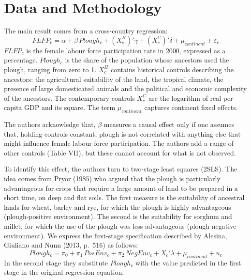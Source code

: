 \documentclass[12pt,a4paper]{article}
\newif\ifshowinstr
\newcommand{\instr}[1]{\ifshowinstr{\leavevmode\color{gray}\itshape\small [#1]\par}\fi}
\begin{document}
\section{Data and Methodology}
\instr{Think about what you need to explain the identification strategy of the authors and why they believe that it is valid. Appendix~B.1 summarizes the main points for OLS, panel data and IV designs. You can use these as a reference.}

The main result comes from a cross-country regression:
\begin{equation}\label{eq:ols}
  FLFP_c = \alpha + \beta\, Plough_c + (X_c^{H})'\gamma + (X_c^{C})'\delta + \mu_{continent} + \varepsilon_c
\end{equation}
$FLFP_c$ is the female labour force participation rate in 2000, expressed as a percentage. $Plough_c$ is the share of the population whose ancestors used the plough, ranging from zero to 1. $X_c^{H}$ contains historical controls describing the ancestors: the agricultural suitability of the land, the tropical climate, the presence of large domesticated animals and the political and economic complexity of the ancestors. The contemporary controls $X_c^{C}$ are the logarithm of real per capita GDP and its square. The term $\mu_{continent}$ captures continent fixed effects.

The authors acknowledge that, $\beta$ measures a causal effect only if one assumes that, holding controls constant, plough is not correlated with anything else that might influence female labour force participation. The authors add a range of other controls (Table VII), but these cannot account for what is not observed.

To identify this effect, the authors turn to two-stage least squares (2SLS). The idea comes from Pryor (1985) who argued that the plough is particularly advantageous for crops that require a large amount of land to be prepared in a short time, on deep and flat soils. The first measure is the suitability of ancestral lands for wheat, barley and rye, for which the plough is highly advantageous (plough-positive environment). The second is the suitability for sorghum and millet, for which the use of the plough was less advantageous (plough-negative environment). We express the first-stage specification described by Alesina, Giuliano and Nunn (2013, p.~516) as follows:
\begin{equation}\label{eq:firststage}
  Plough_c = \pi_0 + \pi_1\, PosEnv_c + \pi_2\, NegEnv_c + X_c'\lambda + \mu_{continent} + u_c
\end{equation}
In the second stage they substitute $Plough_c$ with the value predicted in the first stage in the original regression equation.
\end{document}

